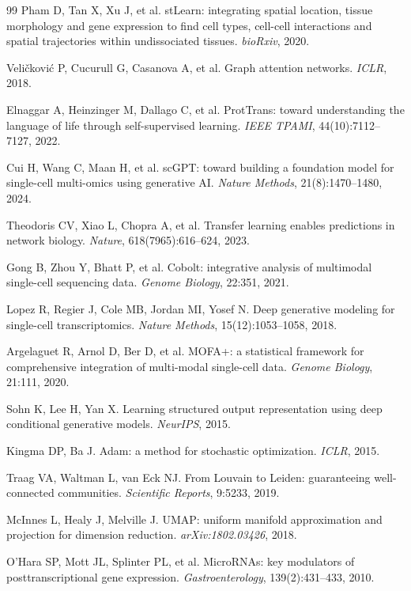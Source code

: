 \documentclass[11pt,a4paper]{article}
\begin{document}
\begin{thebibliography}{99}
Pham D, Tan X, Xu J, et al.
stLearn: integrating spatial location, tissue morphology and gene expression to find cell types, cell-cell interactions and spatial trajectories within undissociated tissues.
\textit{bioRxiv}, 2020.

Veli\v{c}kovi\'{c} P, Cucurull G, Casanova A, et al.
Graph attention networks.
\textit{ICLR}, 2018.

Elnaggar A, Heinzinger M, Dallago C, et al.
ProtTrans: toward understanding the language of life through self-supervised learning.
\textit{IEEE TPAMI}, 44(10):7112--7127, 2022.

Cui H, Wang C, Maan H, et al.
scGPT: toward building a foundation model for single-cell multi-omics using generative AI.
\textit{Nature Methods}, 21(8):1470--1480, 2024.

Theodoris CV, Xiao L, Chopra A, et al.
Transfer learning enables predictions in network biology.
\textit{Nature}, 618(7965):616--624, 2023.

Gong B, Zhou Y, Bhatt P, et al.
Cobolt: integrative analysis of multimodal single-cell sequencing data.
\textit{Genome Biology}, 22:351, 2021.

Lopez R, Regier J, Cole MB, Jordan MI, Yosef N.
Deep generative modeling for single-cell transcriptomics.
\textit{Nature Methods}, 15(12):1053--1058, 2018.

Argelaguet R, Arnol D, Ber D, et al.
MOFA+: a statistical framework for comprehensive integration of multi-modal single-cell data.
\textit{Genome Biology}, 21:111, 2020.

Sohn K, Lee H, Yan X.
Learning structured output representation using deep conditional generative models.
\textit{NeurIPS}, 2015.

Kingma DP, Ba J.
Adam: a method for stochastic optimization.
\textit{ICLR}, 2015.

Traag VA, Waltman L, van Eck NJ.
From Louvain to Leiden: guaranteeing well-connected communities.
\textit{Scientific Reports}, 9:5233, 2019.

McInnes L, Healy J, Melville J.
UMAP: uniform manifold approximation and projection for dimension reduction.
\textit{arXiv:1802.03426}, 2018.

O'Hara SP, Mott JL, Splinter PL, et al.
MicroRNAs: key modulators of posttranscriptional gene expression.
\textit{Gastroenterology}, 139(2):431--433, 2010.


\end{thebibliography}
\end{document}
